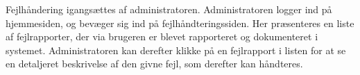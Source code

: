 {Fejlhåndering igangsættes af administratoren. Administratoren logger ind på hjemmesiden, og bevæger sig ind på fejlhåndteringssiden. Her præsenteres en liste af  fejlrapporter, der via brugeren er blevet rapporteret og dokumenteret i systemet. Administratoren kan derefter klikke på en fejlrapport i listen for at se en detaljeret beskrivelse af den givne fejl, som derefter kan håndteres.}
{}
{}
